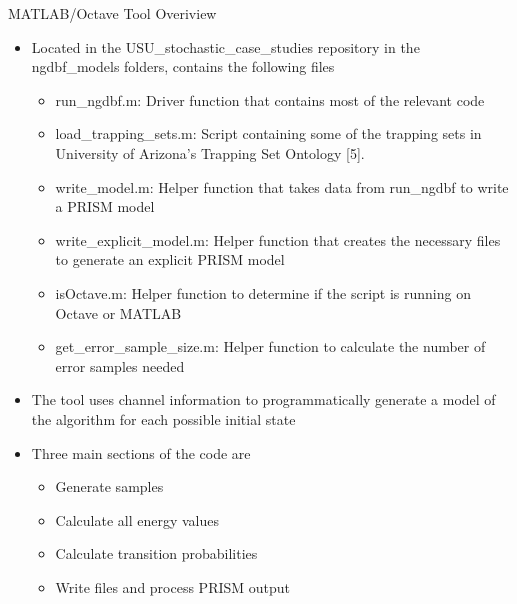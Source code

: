 \documentclass[10pt,ignorenonframetext,]{beamer}
\providecommand{\tightlist}{%
  \setlength{\itemsep}{0pt}\setlength{\parskip}{0pt}}
\begin{document}
\begin{frame}{MATLAB/Octave Tool Overiview}
\protect\hypertarget{matlaboctave-tool-overiview}{}
\begin{itemize}[<+->]
\tightlist
\item
  Located in the USU\_stochastic\_case\_studies repository in the
  ngdbf\_models folders, contains the following files

  \begin{itemize}[<+->]
  \tightlist
  \item
    run\_ngdbf.m: Driver function that contains most of the relevant
    code
  \item
    load\_trapping\_sets.m: Script containing some of the trapping sets
    in University of Arizona's Trapping Set Ontology {[}5{]}.
  \item
    write\_model.m: Helper function that takes data from run\_ngdbf to
    write a PRISM model
  \item
    write\_explicit\_model.m: Helper function that creates the necessary
    files to generate an explicit PRISM model
  \item
    isOctave.m: Helper function to determine if the script is running on
    Octave or MATLAB
  \item
    get\_error\_sample\_size.m: Helper function to calculate the number
    of error samples needed
  \end{itemize}
\item
  The tool uses channel information to programmatically generate a model
  of the algorithm for each possible initial state
\item
  Three main sections of the code are

  \begin{itemize}[<+->]
  \tightlist
  \item
    Generate samples
  \item
    Calculate all energy values
  \item
    Calculate transition probabilities
  \item
    Write files and process PRISM output
  \end{itemize}
\end{itemize}
\end{frame}
\end{document}
